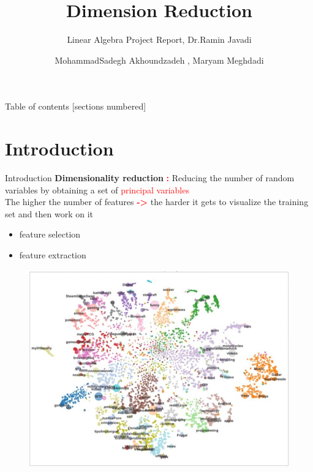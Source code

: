 \documentclass[10pt]{beamer}
\title{Dimension Reduction}
\subtitle{Linear Algebra Project Report, Dr.Ramin Javadi}
\date{}
\author{MohammadSadegh Akhoundzadeh , Maryam Meghdadi}
\institute{Department of Electrical and Computer Engineering, Isfahan University of Technology}
\begin{document}
\maketitle

\begin{frame}{Table of contents}
  [sections numbered]
  \tableofcontents[hideallsubsections]
\end{frame}

\section{Introduction}

\begin{frame}[fragile]{Introduction}
\textbf{Dimensionality reduction} \textcolor{red}{\textbf{:}} Reducing the number of random variables by obtaining a set of \textcolor{red}{principal variables}
\\
 The higher the number of features \textcolor{red}{\textbf{->}}  the harder it gets to visualize the training set and then work on it 

\begin{itemize}
\item feature selection
\item feature extraction				
\end{itemize}
   
  \begin{figure}
  \includegraphics[scale = .22]{1.jpg}
  \end{figure}

\end{frame}
\end{document}
